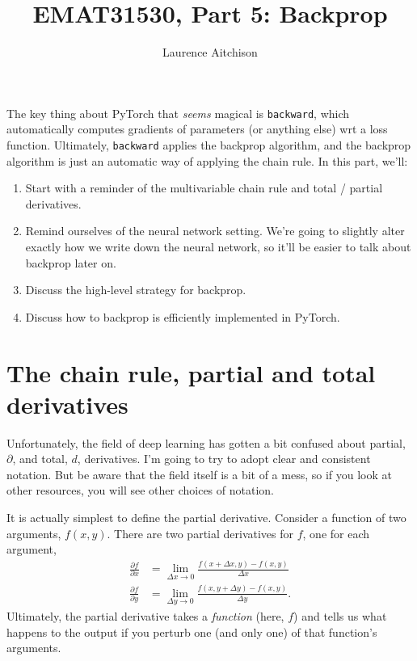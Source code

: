 \documentclass{article}
\title{EMAT31530, Part 5: Backprop}
\author{Laurence Aitchison}
\date{}
\newcommand{\dd}[2][]{\frac{\partial #1}{\partial #2}}
\begin{document}
\maketitle

The key thing about PyTorch that \textit{seems} magical is \verb|backward|, which automatically computes gradients of parameters (or anything else) wrt a loss function.
Ultimately, \verb|backward| applies the backprop algorithm, and the backprop algorithm is just an automatic way of applying the chain rule.  
In this part, we'll:
\begin{enumerate}
  \item Start with a reminder of the multivariable chain rule and total / partial derivatives.
  \item Remind ourselves of the neural network setting. We're going to slightly alter exactly how we write down the neural network, so it'll be easier to talk about backprop later on.
  \item Discuss the high-level strategy for backprop.
  \item Discuss how to backprop is efficiently implemented in PyTorch.
\end{enumerate}

\section{The chain rule, partial and total derivatives}

Unfortunately, the field of deep learning has gotten a bit confused about partial, $\partial$, and total, $d$, derivatives.
I'm going to try to adopt clear and consistent notation.
But be aware that the field itself is a bit of a mess, so if you look at other resources, you will see other choices of notation.

It is actually simplest to define the partial derivative.  Consider a function of two arguments, $f(x, y)$.
There are two partial derivatives for $f$, one for each argument,
\begin{subequations}
\begin{align}
  \label{eq:ddfx}
  \dd[f]{x} &= \lim_{\Delta x \rightarrow 0} \frac{f(x + \Delta x, y) - f(x, y)}{\Delta x}\\
  \label{eq:ddfy}
  \dd[f]{y} &= \lim_{\Delta y \rightarrow 0} \frac{f(x, y + \Delta y) - f(x, y)}{\Delta y}.
\end{align}
\end{subequations}
Ultimately, the partial derivative takes a \textit{function} (here, $f$) and tells us what happens to the output if you perturb one (and only one) of that function's arguments.
\end{document}
